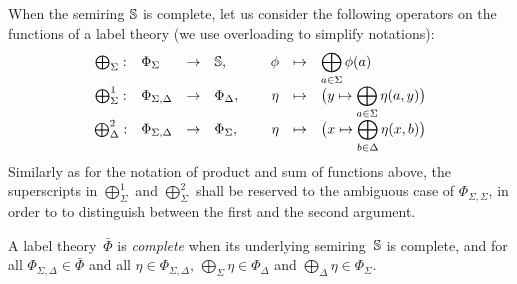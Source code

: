 \noindent
When the semiring $\mathbb{S}$ is complete, 
let us consider the following operators on the functions of a label theory
(we use overloading to simplify notations):
\[
\begin{array}{clclcrcl}
\bigoplus_\Sigma : 
  & \Phi_\Sigma & \to & \mathbb{S}, & \  
  & \phi & \mapsto & \displaystyle\bigoplus_{a \in \Sigma} \phi(a)\\
\bigoplus^1_\Sigma : 
  & \Phi_{\Sigma,\Delta} & \to & \Phi_\Delta, & 
  & \eta & \mapsto & \bigl( y \mapsto \displaystyle\bigoplus_{a \in \Sigma} \eta(a, y) \bigr)\\
\bigoplus^2_\Delta : 
  & \Phi_{\Sigma,\Delta} & \to & \Phi_\Sigma, & 
  & \eta & \mapsto & \bigl( x \mapsto \displaystyle\bigoplus_{b \in \Delta} \eta(x, b) \bigr)\\
\end{array}
\]
%
Similarly as for the notation of product and sum of functions above, 
the superscripts in $\bigoplus^1_\Sigma$ and $\bigoplus^2_\Sigma$
shall be reserved to the ambiguous case of $\Phi_{\Sigma,\Sigma}$,
in order to to distinguish between the first and the second argument.
%
\begin{definition}\label{def:label-th-complete}
A label theory~$\bar\Phi$ is \emph{complete} when 
its underlying semiring~$\mathbb{S}$ is complete, and
for all $\Phi_{\Sigma, \Delta} \in \bar\Phi$ 
and all $\eta \in \Phi_{\Sigma, \Delta}$,
$\bigoplus_\Sigma \eta \in \Phi_{\Delta}$ and 
$\bigoplus_\Delta \eta \in \Phi_{\Sigma}$.
\end{definition}

